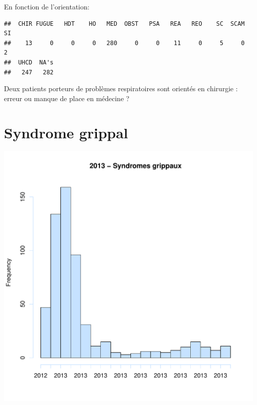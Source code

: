 \documentclass[12pt,english,french,twoside]{book}\usepackage[]{graphicx}\usepackage[]{color}
\makeatletter
\def\maxwidth{ %
  \ifdim\Gin@nat@width>\linewidth
    \linewidth
  \else
    \Gin@nat@width
  \fi
}
\newenvironment{kframe}{%
 \def\at@end@of@kframe{}%
 \ifinner\ifhmode%
  \def\at@end@of@kframe{\end{minipage}}%
  \begin{minipage}{\columnwidth}%
 \fi\fi%
 \def\FrameCommand##1{\hskip\@totalleftmargin \hskip-\fboxsep
 \colorbox{shadecolor}{##1}\hskip-\fboxsep
     \hskip-\linewidth \hskip-\@totalleftmargin \hskip\columnwidth}%
 \MakeFramed {\advance\hsize-\width
   \@totalleftmargin\z@ \linewidth\hsize
   \@setminipage}}%
 {\par\unskip\endMakeFramed%
 \at@end@of@kframe}
\newenvironment{knitrout}{}{} %
\makeatother
\begin{document}
En fonction de l'orientation:
\begin{knitrout}
\color{fgcolor}\begin{kframe}
\begin{verbatim}
##  CHIR FUGUE   HDT    HO   MED  OBST   PSA   REA   REO    SC  SCAM    SI 
##    13     0     0     0   280     0     0    11     0     5     0     2 
##  UHCD  NA's 
##   247   282
\end{verbatim}
\end{kframe}
\end{knitrout}


Deux patients porteurs de problèmes respiratoires sont orientés en chirurgie : erreur ou manque de place en médecine ?

\section{Syndrome grippal}

\begin{knitrout}
\color{fgcolor}
\includegraphics[width=\maxwidth]{figure/grippe} 

\end{knitrout}
\end{document}
